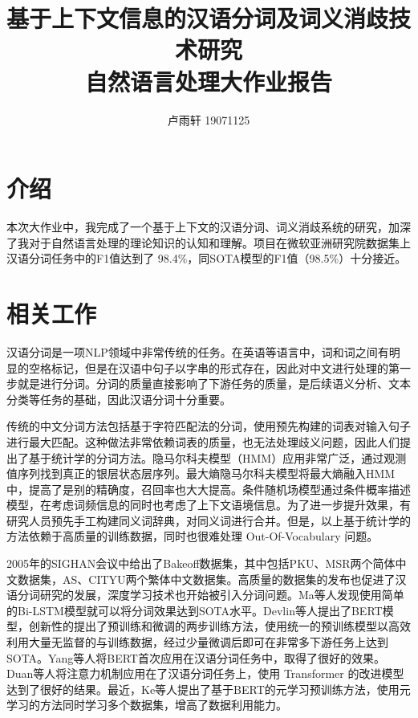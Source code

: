 \documentclass{ctexart}
\title{基于上下文信息的汉语分词及词义消歧技术研究 \\
{\Large 自然语言处理大作业报告}}
\author{卢雨轩 19071125}
\begin{document}


\maketitle

\section{介绍}

本次大作业中，我完成了一个基于上下文的汉语分词、词义消歧系统的研究，加深了我对于自然语言处理的理论知识的认知和理解。项目在微软亚洲研究院数据集上汉语分词任务中的F1值达到了 98.4\%，同SOTA模型的F1值（98.5\%）十分接近。

\section{相关工作}
汉语分词是一项NLP领域中非常传统的任务。在英语等语言中，词和词之间有明显的空格标记，但是在汉语中句子以字串的形式存在，因此对中文进行处理的第一步就是进行分词。分词的质量直接影响了下游任务的质量，是后续语义分析、文本分类等任务的基础，因此汉语分词十分重要。

传统的中文分词方法包括基于字符匹配法的分词，使用预先构建的词表对输入句子进行最大匹配。这种做法非常依赖词表的质量，也无法处理歧义问题，因此人们提出了基于统计学的分词方法。隐马尔科夫模型（HMM）应用非常广泛，通过观测值序列找到真正的银层状态层序列。最大熵隐马尔科夫模型将最大熵融入HMM中，提高了是别的精确度，召回率也大大提高。条件随机场模型通过条件概率描述模型，在考虑词频信息的同时也考虑了上下文语境信息。为了进一步提升效果，有研究人员预先手工构建同义词辞典，对同义词进行合并。但是，以上基于统计学的方法依赖于高质量的训练数据，同时也很难处理 Out-Of-Vocabulary 问题。

2005年的SIGHAN会议中给出了Bakeoff数据集，其中包括PKU、MSR两个简体中文数据集，AS、CITYU两个繁体中文数据集。高质量的数据集的发布也促进了汉语分词研究的发展，深度学习技术也开始被引入分词问题。Ma\cite{maStateoftheartChineseWord2018}等人发现使用简单的Bi-LSTM模型就可以将分词效果达到SOTA水平。Devlin\cite{devlinBERTPretrainingDeep2019}等人提出了BERT模型，创新性的提出了预训练和微调的两步训练方法，使用统一的预训练模型以高效利用大量无监督的与训练数据，经过少量微调后即可在非常多下游任务上达到SOTA。Yang\cite{yangBERTMeetsChinese2019}等人将BERT首次应用在汉语分词任务中，取得了很好的效果。Duan\cite{duanAttentionAllYou2020}等人将注意力机制应用在了汉语分词任务上，使用 Transformer 的改进模型达到了很好的结果。最近，Ke\cite{kePretrainingMetaLearning2021}等人提出了基于BERT的元学习预训练方法，使用元学习的方法同时学习多个数据集，增高了数据利用能力。
\end{document}

